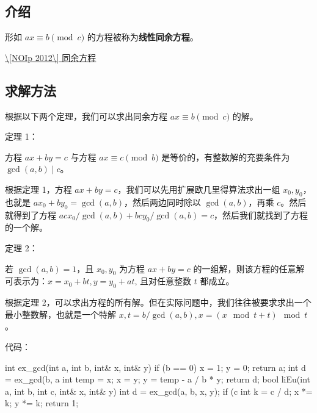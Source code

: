
\subsection{介绍}

形如 $ax \equiv b \pmod c$ 的方程被称为\textbf{线性同余方程}。

\href{https://www.luogu.org/problemnew/show/P1082}{\textbackslash{}[NOIp 2012\textbackslash{}] 同余方程}

\subsection{求解方法}

根据以下两个定理，我们可以求出同余方程 $ax \equiv b \pmod c$ 的解。

定理 1：

\begin{QUOTE}{}{}
方程 $ax+by=c$ 与方程 $ax \equiv c \pmod b$ 是等价的，有整数解的充要条件为 $\gcd(a,b) \mid c$。
\end{QUOTE}

根据定理 1，方程 $ax+by=c$，我们可以先用扩展欧几里得算法求出一组 $x_0,y_0$，也就是 $ax_0+by_0=\gcd(a,b)$，然后两边同时除以 $\gcd(a,b)$，再乘 $c$。然后就得到了方程 $acx_0/\gcd(a,b)+bcy_0/\gcd(a,b)=c$，然后我们就找到了方程的一个解。

定理 2：

\begin{QUOTE}{}{}
若 $\gcd(a,b)=1$，且 $x_0,y_0$ 为方程 $ax+by=c$ 的一组解，则该方程的任意解可表示为：$x=x_0+bt,y=y_0+at$, 且对任意整数 $t$ 都成立。
\end{QUOTE}

根据定理 2，可以求出方程的所有解。但在实际问题中，我们往往被要求求出一个最小整数解，也就是一个特解 $x,t=b/\gcd(a,b),x=(x \mod t+t)\mod t$。

代码：

\begin{cppcode}
int ex_gcd(int a, int b, int& x, int& y) {
  if (b == 0) {
    x = 1;
    y = 0;
    return a;
  }
  int d = ex_gcd(b, a %
  int temp = x;
  x = y;
  y = temp - a / b * y;
  return d;
}
bool liEu(int a, int b, int c, int& x, int& y) {
  int d = ex_gcd(a, b, x, y);
  if (c %
  int k = c / d;
  x *= k;
  y *= k;
  return 1;
}
\end{cppcode}

